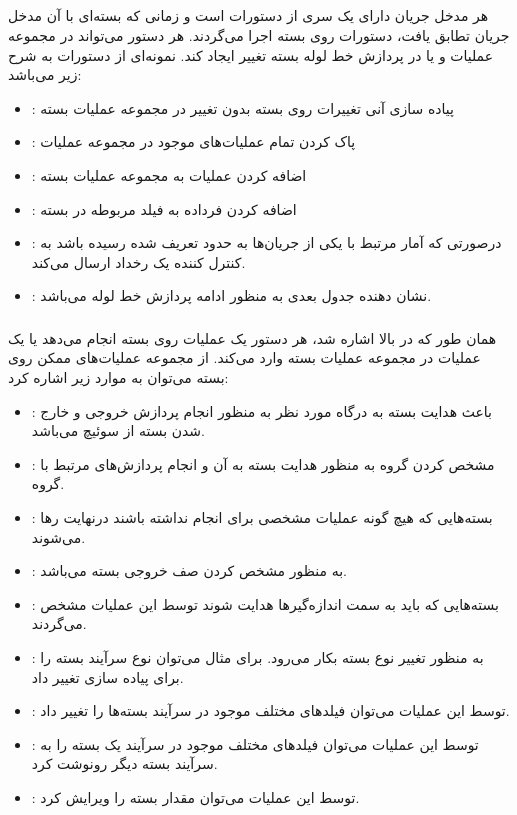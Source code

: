 \subsection{}
هر مدخل جریان دارای یک سری از دستورات است و زمانی که بسته‌ای با آن مدخل جریان تطابق یافت، دستورات روی بسته اجرا می‌گردند. هر دستور می‌تواند در مجموعه عملیات و یا در پردازش خط لوله بسته تغییر ایجاد کند. نمونه‌ای از دستورات به شرح زیر می‌باشد:
\begin{itemize}
	\item {}:
پیاده سازی آنی تغییرات روی بسته بدون تغییر در مجموعه عملیات بسته
	\item {}:
پاک کردن تمام عملیات‌های موجود در مجموعه عملیات
	\item {}:
اضافه کردن عملیات به مجموعه عملیات بسته
	\item {}:
اضافه کردن فرداده به فیلد مربوطه در بسته
	\item {}:
درصورتی که آمار مرتبط با یکی از جریان‌ها به حدود تعریف شده رسیده باشد به کنترل کننده یک رخداد ارسال می‌کند.
	\item {}:
نشان دهنده جدول بعدی به منظور ادامه پردازش خط لوله می‌باشد.
\end{itemize}
\subsubsection{}
همان طور که در بالا اشاره شد، هر دستور یک عملیات روی بسته انجام می‌دهد یا یک عملیات در مجموعه عملیات بسته وارد می‌کند. از مجموعه عملیات‌های ممکن روی بسته می‌توان به موارد زیر اشاره کرد:
\begin{itemize}
	\item {}:
باعث هدایت بسته به درگاه مورد نظر به منظور انجام پردازش خروجی و خارج شدن بسته از سوئیچ می‌باشد.
	\item {}:
مشخص کردن گروه به منظور هدایت بسته به آن و انجام پردازش‌های مرتبط با گروه.
	\item {}:
بسته‌هایی که هیچ گونه عملیات مشخصی برای انجام نداشته باشند درنهایت رها می‌شوند.
	\item {}:
به منظور مشخص کردن صف خروجی بسته می‌باشد.
	\item {}:
بسته‌هایی که باید به سمت اندازه‌گیر‌ها هدایت شوند توسط این عملیات مشخص می‌گردند.
	\item {}:
به منظور تغییر نوع بسته بکار می‌رود. برای مثال می‌توان نوع سرآیند بسته را برای پیاده سازی  تغییر داد.
	\item {}:
توسط این عملیات می‌توان فیلد‌های مختلف موجود در سرآیند بسته‌ها را تغییر داد.
	\item {}:
توسط این عملیات می‌توان فیلد‌های مختلف موجود در سرآیند یک بسته را به سرآیند بسته دیگر رونوشت کرد.
	\item {}:
توسط این عملیات می‌توان مقدار  بسته را ویرایش کرد.
\end{itemize}

